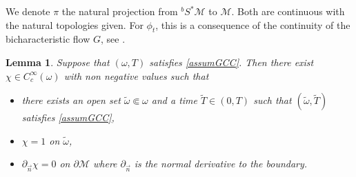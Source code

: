 \documentclass[10pt]{amsart}
\newtheorem{lemma}[theorem]{Lemma}
\theoremstyle{definition}
\let\mc\mathcal
\newcommand{\M}{\mc{M}}
\begin{document}
We denote $\pi$ the natural projection from $^bS^*\M$ to $\M$. Both are continuous with the natural topologies given. For $\phi_t$, this is a consequence of the continuity of the bicharacteristic flow $G$, see \cite[Lem.\,3.31]{MS:78}.
\begin{lemma}\label{lemma:gcc-smaller-subset}
Suppose that $(\omega, T)$ satisfies \ref{assumGCC}. Then there exist $\chi\in C^{\infty}_c(\omega)$ with non negative values such that
\begin{itemize}
\item there exists an open set $\widetilde{\omega}\Subset \omega$ and a time $\widetilde{T}\in(0,T)$ such that $(\widetilde{\omega}, \widetilde{T})$ satisfies \ref{assumGCC},
\item $\chi=1$ on $\widetilde{\omega}$,
\item $\partial_{\vec n} \chi=0$ on $\partial \M$ where $\partial_{\vec n}$ is the normal derivative to the boundary.
\end{itemize}
\end{lemma}
\end{document}

